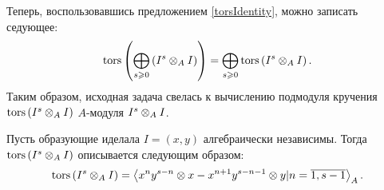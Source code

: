     Теперь, воспользовавшись предложением \ref{torsIdentity}, можно записать седующее:
    \begin{equation*}
        \textup{tors}\left(\bigoplus_{s \geqslant 0} \left( I^s \otimes_A I \right)\right) = 
        \bigoplus_{s \geqslant 0}\textup{tors}\left( I^s \otimes_A I \right).
    \end{equation*}
    Таким образом, исходная задача свелась к вычислению подмодуля кручения \linebreak$\textup{tors}\left( I^s \otimes_A I \right)$ 
    $A$-модуля $I^s \otimes_A I$.
    \begin{Theorem} \label{tors_simple}
        Пусть образующие иделала $I = (x, y)$ алгебраически независимы. 
        Тогда $\textup{tors}\left(I^s \otimes_A I\right)$ описывается следующим образом:
        \begin{equation*}
            \textup{tors}\left(I^s \otimes_A I\right) = \left< x^ny^{s - n} \otimes x - x^{n + 1}y^{s - n - 1} \otimes y |
             n = \overline{1, s-1}\right>_A.
        \end{equation*}
    \end{Theorem}
